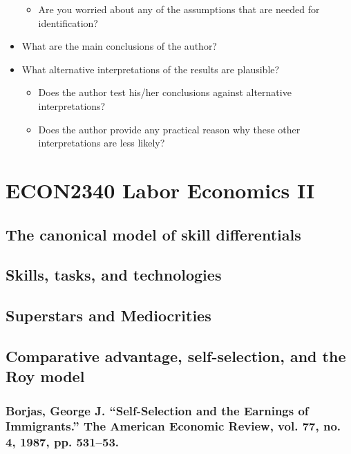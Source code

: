 \documentclass{article}
\begin{document}
\begin{itemize}
\begin{itemize}
        \item Are you worried about any of the assumptions that are needed for identification?
    \end{itemize}
    \item What are the main conclusions of the author?
    \item What alternative interpretations of the results are plausible?
    \begin{itemize}
        \item Does the author test his/her conclusions against alternative interpretations?
        \item Does the author provide any practical reason why these other interpretations are less likely?
    \end{itemize}
\end{itemize}







\section{ECON2340 Labor Economics II}

\subsection{The canonical model of skill differentials}

\subsection{Skills, tasks, and technologies}

\subsection{Superstars and Mediocrities}

\subsection{Comparative advantage, self-selection, and the Roy model}

\subsubsection{Borjas, George J. “Self-Selection and the Earnings of Immigrants.” The American Economic
Review, vol. 77, no. 4, 1987, pp. 531–53.}
\end{document}
